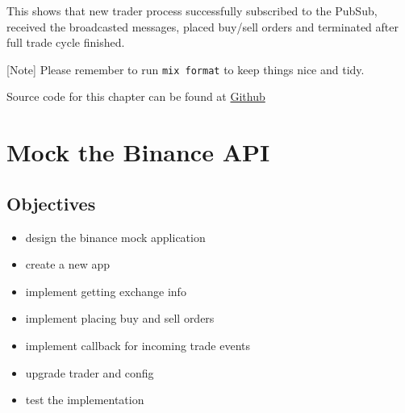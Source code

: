 \documentclass[
]{book}
\newenvironment{Shaded}{\begin{snugshade}}{\end{snugshade}}
\newcommand{\AttributeTok}[1]{\textcolor[rgb]{0.77,0.63,0.00}{#1}}
\newcommand{\CommentTok}[1]{\textcolor[rgb]{0.56,0.35,0.01}{\textit{#1}}}
\newcommand{\ErrorTok}[1]{\textcolor[rgb]{0.64,0.00,0.00}{\textbf{#1}}}
\newcommand{\ExtensionTok}[1]{#1}
\newcommand{\KeywordTok}[1]{\textcolor[rgb]{0.13,0.29,0.53}{\textbf{#1}}}
\newcommand{\NormalTok}[1]{#1}
\newcommand{\OperatorTok}[1]{\textcolor[rgb]{0.81,0.36,0.00}{\textbf{#1}}}
\newcommand{\StringTok}[1]{\textcolor[rgb]{0.31,0.60,0.02}{#1}}
\providecommand{\tightlist}{%
  \setlength{\itemsep}{0pt}\setlength{\parskip}{0pt}}
\begin{document}
\begin{Shaded}
\end{Shaded}

This shows that new trader process successfully subscribed to the PubSub, received the broadcasted messages, placed buy/sell orders and terminated after full trade cycle finished.

{[}Note{]} Please remember to run \texttt{mix\ format} to keep things nice and tidy.

Source code for this chapter can be found at \href{https://github.com/frathon/create-a-cryptocurrency-trading-bot-in-elixir-source-code/tree/chapter_03}{Github}

\hypertarget{mock-the-binance-api}{%
\chapter{Mock the Binance API}\label{mock-the-binance-api}}

\hypertarget{objectives-3}{%
\section{Objectives}\label{objectives-3}}

\begin{itemize}
\tightlist
\item
  design the binance mock application
\item
  create a new app
\item
  implement getting exchange info
\item
  implement placing buy and sell orders
\item
  implement callback for incoming trade events
\item
  upgrade trader and config
\item
  test the implementation
\end{itemize}
\end{document}
